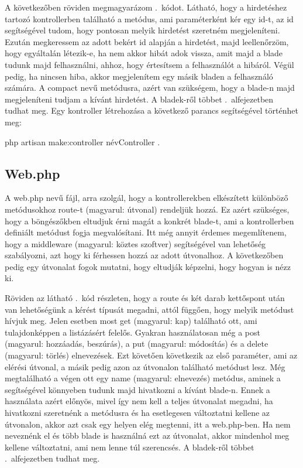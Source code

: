 \documentclass[]{thesis-ekf}
\theoremstyle{definition}
\theoremstyle{remark}
\begin{document}
			A következőben röviden megmagyarázom .~kódot. Látható, hogy a hirdetéshez tartozó kontrollerben található a metódus, ami paraméterként kér egy id-t, az id segítségével tudom, hogy pontosan melyik hirdetést szeretném megjeleníteni. Ezután megkeressem az adott bekért id alapján a hirdetést, majd leellenőrzöm, hogy egyáltalán létezik-e, ha nem akkor hibát adok vissza, amit majd a blade tudunk majd felhasználni, ahhoz, hogy értesítsem a felhasználót a hibáról. Végül pedig, ha nincsen hiba, akkor megjelenítem egy másik bladen a felhasználó számára. A compact nevű metódusra, azért van szükségem, hogy a blade-n majd megjeleníteni tudjam a kívánt hirdetést. A bladek-ről többet .~alfejezetben tudhat meg.  Egy kontroller létrehozása a következő parancs segítségével történhet meg:
		\begin{center} 
			php artisan make:controller névController .
		\end{center}
		  
	\subsection{Web.php}
		A web.php nevű fájl, arra szolgál, hogy a kontrollerekben elkészített különböző metódusokhoz route-t (magyarul: útvonal) rendeljük hozzá. Ez azért szükséges, hogy a böngészőkben eltudjuk érni magát a konkrét blade-t, ami a kontrollerben definiált metódust fogja megvalósítani. Itt még annyit érdemes megemlítenem, hogy a middleware (magyarul: köztes szoftver) segítségével van lehetőség szabályozni, azt hogy ki férhessen hozzá az adott útvonalhoz. A következőben pedig egy útvonalat fogok mutatni, hogy eltudják képzelni, hogy hogyan is nézz ki.
	
		
	
		Röviden az látható .~kód részleten, hogy a route és két darab kettőspont után van lehetőségünk a kérést típusát megadni, attól függően, hogy melyik metódust hívjuk meg. Jelen esetben most get (magyarul: kap) található ott, ami tulajdonképpen a listázásért felelős. Gyakran használatosan még a post (magyarul: hozzáadás, beszúrás), a put (magyarul: módosítás) és a delete (magyarul: törlés) elnevezések. Ezt követően következik az első paraméter, ami az elérési útvonal, a másik pedig azon az útvonalon található metódust lesz. Még megtalálható a végen ott egy name (magyarul: elnevezés) metódus, aminek a segítségével könnyeben tudunk majd hivatkozni a kívánt blade-n. Ennek a használata azért előnyös, mivel így nem kell a teljes útvonalat megadni, ha hivatkozni szeretnénk a metódusra és ha esetlegesen változtatni kellene az útvonalon, akkor azt csak egy helyen elég megtenni, itt a web.php-ben. Ha nem neveznénk el és több blade is használná ezt az útvonalat, akkor mindenhol meg kellene változtatni, ami nem lenne túl szerencsés. A bladek-ről többet .~alfejezetben tudhat meg.
		
\end{document}
